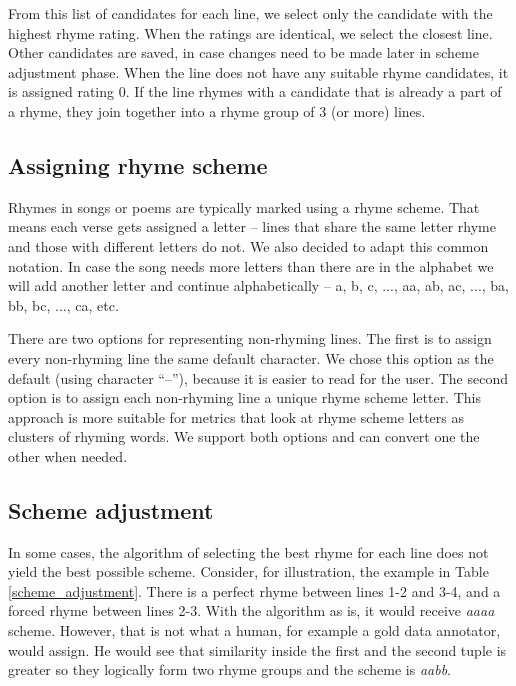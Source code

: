 From this list of candidates for each line, we select only the candidate with the highest rhyme rating. When the ratings are identical, we select the closest line. Other candidates are saved, in case changes need to be made later in scheme adjustment phase. When the line does not have any suitable rhyme candidates, it is assigned rating 0. If the line rhymes with a candidate that is already a part of a rhyme, they join together into a rhyme group of 3 (or more) lines.
 



\subsection{Assigning rhyme scheme}\label{sec:scheme}
 Rhymes in songs or poems are typically marked using a rhyme scheme. That means each verse gets assigned a letter -- lines that share the same letter rhyme and those with different letters do not. We also decided to adapt this common notation. In case the song needs more letters than there are in the alphabet\added{,} we will add another letter and continue alphabetically -- a, b, c, ..., aa, ab, ac, ..., ba, bb, bc, ..., ca, etc.
 
 There are two options for representing non-rhyming lines. The first is to assign every non-rhyming line the same default character. We chose this option as the default (using character ``--''), because it is easier to read for the user. The second option is to assign each non-rhyming line a unique rhyme scheme letter. This approach is more suitable for metrics that look at rhyme scheme letters as clusters of rhyming words. We support both options and can convert one  the other when needed.

\subsection{Scheme adjustment}\label{sec:scheme-adjustment}
In some cases, the algorithm of selecting the best rhyme for each line does not yield the best possible scheme. Consider, for illustration, the example in Table \ref{scheme_adjustment}. There is a perfect rhyme between lines 1-2 and 3-4, and a forced rhyme between lines 2-3. With the algorithm as is, it would receive  \textit{aaaa} scheme. However, that is not what a human, for example a gold data annotator, would assign. He would see that similarity inside the first and the second tuple is greater so they logically form two rhyme groups and the scheme is \textit{aabb}. 


